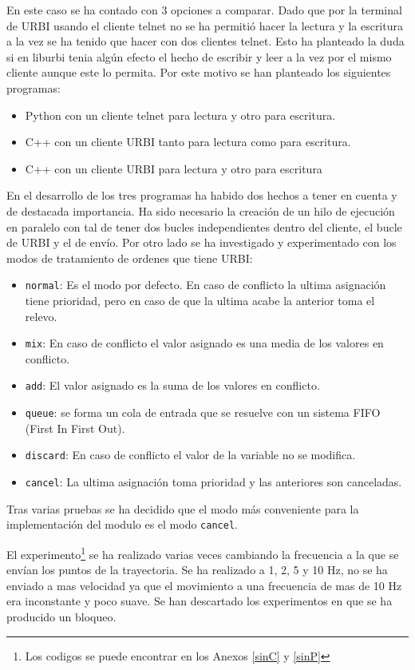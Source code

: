 \documentclass[12pt,a4paper,final,twoside]{article}
\begin{document}
En este caso se ha contado con 3 opciones a comparar. Dado que por la terminal de URBI usando el cliente telnet no se ha permitió hacer la lectura y la escritura a la vez se ha tenido que hacer con dos clientes telnet. Esto ha planteado la duda si en liburbi tenia algún efecto el hecho de escribir y leer a la vez por el mismo cliente aunque este lo permita. Por este motivo se han planteado los siguientes programas:
\begin{itemize}
\item Python con un cliente telnet para lectura y otro para escritura.
\item C++ con un cliente URBI tanto para lectura como para escritura.
\item C++ con un cliente URBI para lectura y otro para escritura
\end{itemize}

En el desarrollo de los tres programas ha habido dos hechos a tener en cuenta y de destacada importancia.
Ha sido necesario la creación de un hilo de ejecución en paralelo con tal de tener dos bucles independientes dentro del cliente, el bucle de URBI y el de envío.
Por otro lado se ha investigado y experimentado con los modos de tratamiento  de ordenes que tiene URBI:
\begin{itemize}
\item \texttt{normal}: Es el modo por defecto. En caso de conflicto la ultima asignación tiene prioridad, pero en caso de que la ultima acabe la anterior toma el relevo.
\item \texttt{mix}: En caso de conflicto el valor asignado es una media de los valores en conflicto.
\item \texttt{add}: El valor asignado es la suma de los valores en conflicto.
\item \texttt{queue}: se forma un cola de entrada que se resuelve con un sistema FIFO (First In First Out).
\item \texttt{discard}: En caso de conflicto el valor de la variable no se modifica.
\item \texttt{cancel}: La ultima asignación toma prioridad y las anteriores son canceladas. 
\end{itemize}

Tras varias pruebas se ha decidido que el modo más conveniente para la implementación del modulo es el modo \texttt{cancel}.

El experimento\footnote{Los codigos se puede encontrar en los Anexos \ref{sinC} y \ref{sinP}} se ha realizado varias veces cambiando la frecuencia a la que se envían los puntos de la trayectoria. Se ha realizado a 1, 2, 5 y 10 Hz, no se ha enviado a mas velocidad ya que el movimiento a una frecuencia de mas de 10 Hz era inconstante y poco suave.
Se han descartado los experimentos en que se ha producido un bloqueo.
 
\end{document}
